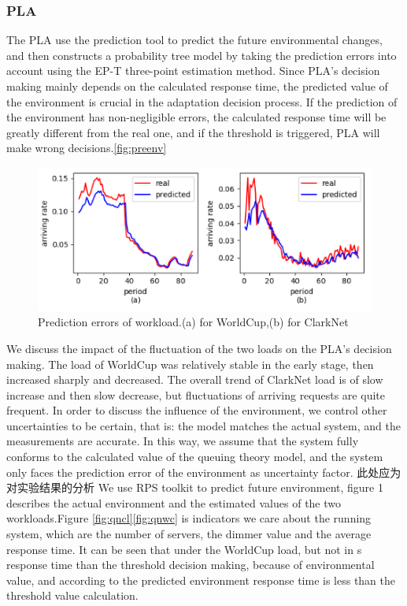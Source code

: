 \documentclass[sigconf]{acmart}
\begin{document}
\subsubsection{PLA}
The PLA use the prediction tool to predict the future environmental changes, and then constructs a probability tree model by taking the prediction errors into account using the EP-T three-point estimation method\cite{ept}. Since PLA's decision making mainly depends on the calculated response time, the predicted value of the environment is crucial in the adaptation decision process. If the prediction of the environment has non-negligible errors, the calculated response time will be greatly different from the real one, and if the threshold is triggered, PLA will make wrong decisions.\ref{fig:preenv}
\begin{figure}[h]
	\centering
	\includegraphics[width=\linewidth]{preenv}
	\caption{Prediction errors of workload.(a) for WorldCup,(b) for ClarkNet}
	
\end{figure}
We discuss the impact of the fluctuation of the two loads on the PLA's decision making. The load of WorldCup was relatively stable in the early stage, then increased sharply and decreased. The overall trend of ClarkNet load is of slow increase and then slow decrease, but fluctuations of arriving requests are quite frequent. In order to discuss the influence of the environment, we control other uncertainties to be certain, that is: the model matches the actual system, and the measurements are accurate. In this way, we assume that the system fully conforms to the calculated value of the queuing theory model, and the system only faces the prediction error of the environment as uncertainty factor.
此处应为对实验结果的分析
We use RPS toolkit to predict future environment, figure 1 describes the  actual environment and the estimated values of the two workloads.Figure \ref{fig:qncl}\ref{fig:qnwc} is indicators we care about the running system, which are the number of servers, the dimmer value and the average response time. It can be seen that under the WorldCup load, but not in s response time than the threshold decision making, because of environmental value, and according to the predicted environment response time is less than the threshold value calculation.
\end{document}
